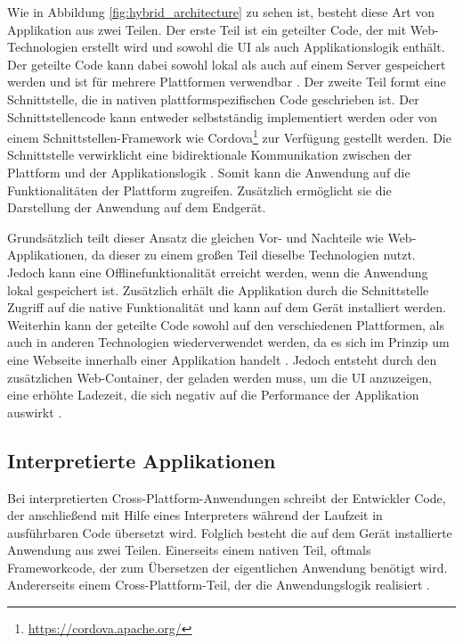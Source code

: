 Wie in Abbildung \ref{fig:hybrid_architecture} zu sehen ist, besteht diese Art von Applikation aus zwei Teilen.
Der erste Teil ist ein geteilter Code, der mit Web-Technologien erstellt wird und sowohl die UI als auch Applikationslogik enthält. Der geteilte Code kann dabei sowohl lokal als auch auf einem Server gespeichert werden und ist für mehrere Plattformen verwendbar \cite{2017hybrid_approach_end}.
Der zweite Teil formt eine Schnittstelle, die in nativen plattformspezifischen Code geschrieben ist. Der Schnittstellencode kann entweder selbstständig implementiert werden oder von einem Schnittstellen-Framework wie Cordova\footnote{\url{https://cordova.apache.org/}} zur Verfügung gestellt werden. Die Schnittstelle verwirklicht eine bidirektionale Kommunikation zwischen der Plattform und der Applikationslogik \cite{ELKASSAS2017163}. Somit kann die Anwendung auf die Funktionalitäten der Plattform zugreifen. Zusätzlich ermöglicht sie die Darstellung der Anwendung auf dem Endgerät. 

Grundsätzlich teilt dieser Ansatz die gleichen Vor- und Nachteile wie Web-Applikationen, da dieser zu einem großen Teil dieselbe Technologien nutzt. Jedoch kann eine Offlinefunktionalität erreicht werden, wenn die Anwendung lokal gespeichert ist. Zusätzlich erhält die Applikation durch die Schnittstelle Zugriff auf die native Funktionalität und kann auf dem Gerät installiert werden. Weiterhin kann der geteilte Code sowohl auf den verschiedenen Plattformen, als auch in anderen Technologien wiederverwendet werden, da es sich im Prinzip um eine Webseite innerhalb einer Applikation handelt \cite{IEEE_development_classes}. Jedoch entsteht durch den zusätzlichen Web-Container, der geladen werden muss, um die UI anzuzeigen, eine erhöhte Ladezeit, die sich negativ auf die Performance der Applikation auswirkt \cite{IEEE_development_classes}.

\subsection{Interpretierte Applikationen}
\label{cha:3_2_interpretiert}
Bei interpretierten Cross-Plattform-Anwendungen schreibt der Entwickler Code, der anschließend mit Hilfe eines Interpreters während der Laufzeit in ausführbaren Code übersetzt wird. Folglich besteht die auf dem Gerät installierte Anwendung aus zwei Teilen. Einerseits einem nativen Teil, oftmals Frameworkcode, der zum Übersetzen der eigentlichen Anwendung benötigt wird. Andererseits einem Cross-Plattform-Teil, der die Anwendungslogik realisiert \cite{IEEE_development_classes}.

